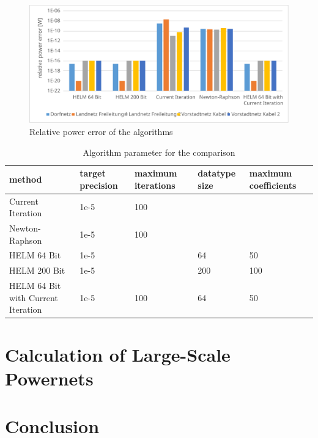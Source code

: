 \begin{figure}
	\centering
	\includegraphics[scale=0.7]{figures/comparison_accuracy}
	\caption[Comparison, accuracy]{Relative power error of the algorithms}
	\label{fig:comparison_accuracy}
\end{figure}

\begin{table}
	\small
	\begin{tabularx}{\textwidth}{|X|p{1.5cm}|p{1.6cm}|p{1.5cm}|p{1.9cm}|}
		\hline
		method & target precision & maximum iterations & datatype size & maximum coefficients \\ \hline
		Current Iteration & 1e-5 & 100 & & \\ \hline
		Newton-Raphson & 1e-5 & 100 & & \\ \hline
		HELM 64 Bit & 1e-5 & & 64 & 50 \\ \hline
		HELM 200 Bit & 1e-5 & & 200 & 100 \\ \hline
		HELM 64 Bit with Current Iteration & 1e-5 & 100 & 64 & 50 \\ \hline
	\end{tabularx}
	\caption{Algorithm parameter for the comparison}
	\label{tab:comparison_parameter}
\end{table}

\section{Calculation of Large-Scale Powernets}
\label{sec:large_scale_powernets}

\section{Conclusion}
